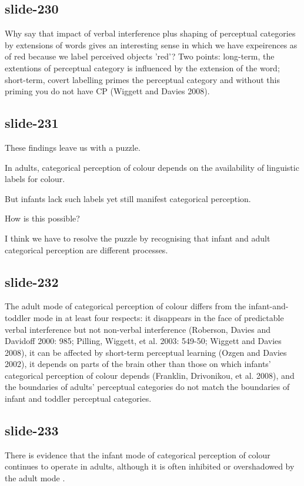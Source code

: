 \documentclass[12pt,\papersize]{extarticle}
\begin{document}
\subsection{slide-230}
Why say that impact of verbal interference plus shaping of perceptual categories by extensions of words gives an interesting sense in which we have expeirences as of red because we label perceived objects 'red'?  Two points: long-term, the extentions of perceptual category is influenced by the extension of the word; short-term, covert labelling primes the perceptual category and without this priming you do not have CP (Wiggett and Davies 2008).
 
\subsection{slide-231}
These findings leave us with a puzzle.
 
In adults, categorical perception of colour depends on the availability of linguistic labels for colour.
 
But infants lack such labels yet still manifest categorical perception.
 
How is this possible?
 
I think we have to resolve the puzzle by recognising that infant and adult categorical perception are different processes.
 
\subsection{slide-232}
The adult mode of categorical perception of colour differs from the infant-and-toddler mode in at least four respects: it disappears in the face of predictable verbal interference but not non-verbal interference (Roberson, Davies and Davidoff 2000: 985; Pilling, Wiggett, et al. 2003: 549-50; Wiggett and Davies 2008), it can be affected by short-term perceptual learning (Ozgen and Davies 2002), it depends on parts of the brain other than those on which infants' categorical perception of colour depends (Franklin, Drivonikou, et al. 2008), and the boundaries of adults' perceptual categories do not match the boundaries of infant and toddler perceptual categories.
 
\subsection{slide-233}
There is evidence that the infant mode of categorical perception of colour continues to operate in adults, although it is often inhibited or overshadowed by the adult mode \citep{Gilbert:2006yb}.
 
\end{document}
